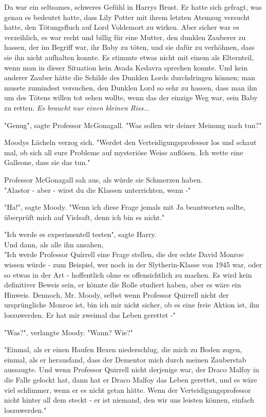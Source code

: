 {Da war ein seltsames, schweres Gefühl in Harrys Brust. Er hatte sich gefragt, was genau es bedeutet hatte, dass Lily Potter mit ihrem letzten Atemzug versucht hatte, den Tötungsfluch auf Lord Voldemort zu wirken. Aber sicher war es verzeihlich, es war recht und billig für eine Mutter, den dunklen Zauberer zu hassen, der im Begriff war, ihr Baby zu töten, und sie dafür zu verhöhnen, dass sie ihn nicht aufhalten konnte. Es stimmte etwas nicht mit einem als Elternteil, wenn man in dieser Situation kein Avada Kedavra sprechen konnte. Und kein anderer Zauber hätte die Schilde des Dunklen Lords durchdringen können; man musste zumindest versuchen, den Dunklen Lord so sehr zu hassen, dass man ihn um des Tötens willen tot sehen wollte, wenn das der einzige Weg war, sein Baby zu retten. \emph{Es braucht nur einen kleinen Riss.}..

"Genug", sagte Professor McGonagall. "Was sollen wir deiner Meinung nach tun?"

Moodys Lächeln verzog sich. "Werdet den Verteidigungsprofessor los und schaut mal, ob sich all eure Probleme auf mysteriöse Weise auflösen. Ich wette eine Galleone, dass sie das tun."

Professor McGonagall sah aus, als würde sie Schmerzen haben.\\ "Alastor - aber - wirst du die Klassen unterrichten, wenn -"

"Ha!", sagte Moody. "Wenn ich diese Frage jemals mit Ja beantworten sollte, überprüft mich auf Vielsaft, denn ich bin es nicht."

"Ich werde es experimentell testen", sagte Harry.\\ Und dann, als alle ihn ansahen,\\ "Ich werde Professor Quirrell eine Frage stellen, die der echte David Monroe wissen würde - zum Beispiel, wer noch in der Slytherin-Klasse von 1945 war, oder so etwas in der Art - hoffentlich ohne es offensichtlich zu machen. Es wird kein definitiver Beweis sein, er könnte die Rolle studiert haben, aber es wäre ein Hinweis. Dennoch, Mr. Moody, selbst wenn Professor Quirrell nicht der ursprüngliche Monroe ist, bin ich mir nicht sicher, ob es eine freie Aktion ist, ihn loszuwerden. Er hat mir zweimal das Leben gerettet -"

"Was?", verlangte Moody. "Wann? Wie?"

"Einmal, als er einen Haufen Hexen niederschlug, die mich zu Boden zogen, einmal, als er herausfand, dass der Dementor mich durch meinen Zauberstab aussaugte. Und wenn Professor Quirrell nicht derjenige war, der Draco Malfoy in die Falle gelockt hat, dann hat er Draco Malfoy das Leben gerettet, und es wäre viel schlimmer, wenn er es nicht getan hätte. Wenn der Verteidigungsprofessor nicht hinter all dem steckt - er ist niemand, den wir uns leisten können, einfach loszuwerden."

}
